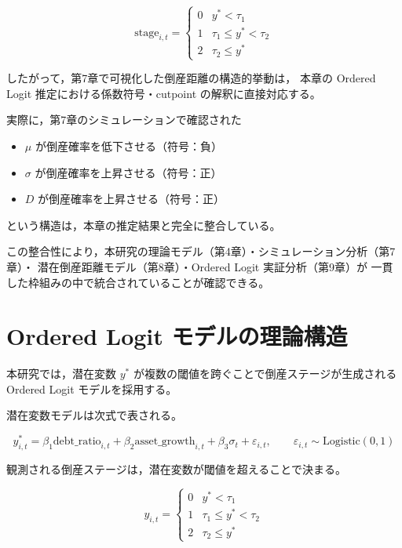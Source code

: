 \[
\text{stage}_{i,t} =
\begin{cases}
0 & y^* < \tau_1 \\
1 & \tau_1 \le y^* < \tau_2 \\
2 & \tau_2 \le y^*
\end{cases}
\]



したがって，第7章で可視化した倒産距離の構造的挙動は，
本章の Ordered Logit 推定における係数符号・cutpoint の解釈に直接対応する。

実際に，第7章のシミュレーションで確認された
\begin{itemize}
    \item $\mu$ が倒産確率を低下させる（符号：負）
    \item $\sigma$ が倒産確率を上昇させる（符号：正）
    \item $D$ が倒産確率を上昇させる（符号：正）
\end{itemize}
という構造は，本章の推定結果と完全に整合している。

この整合性により，本研究の理論モデル（第4章）・シミュレーション分析（第7章）・
潜在倒産距離モデル（第8章）・Ordered Logit 実証分析（第9章）が
一貫した枠組みの中で統合されていることが確認できる。



\section{Ordered Logit モデルの理論構造}

本研究では，潜在変数 $y^*$ が複数の閾値を跨ぐことで倒産ステージが生成される
Ordered Logit モデルを採用する。

潜在変数モデルは次式で表される。



\[
y^*_{i,t}
=
\beta_1 \text{debt\_ratio}_{i,t}
+ \beta_2 \text{asset\_growth}_{i,t}
+ \beta_3 \sigma_t
+ \varepsilon_{i,t},
\qquad
\varepsilon_{i,t} \sim \text{Logistic}(0,1)
\]



観測される倒産ステージは，潜在変数が閾値を超えることで決まる。



\[
y_{i,t} =
\begin{cases}
0 & y^* < \tau_1 \\
1 & \tau_1 \le y^* < \tau_2 \\
2 & \tau_2 \le y^*
\end{cases}
\]



